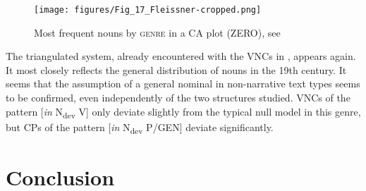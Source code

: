 \documentclass[output=paper,colorlinks,citecolor=brown]{langscibook}
\begin{document}
 
\begin{figure}[t]
    \centering
    \texttt{[image: figures/Fig\_17\_Fleissner-cropped.png]}
    \caption{Most frequent nouns by \textsc{genre} \textup{in a CA plot (}\textsc{ZERO}), see }
    \label{fig:fleissner:15}
\end{figure}

The triangulated system, already encountered with the VNCs in , appears again. It most closely reflects the general distribution of nouns in the 19th century. It seems that the assumption of a general nominal  in non-narrative text types seems to be confirmed, even independently of the two structures studied. VNCs of the pattern [\textit{in} N\textsubscript{dev} V] only deviate slightly from the typical null model in this genre, but CPs of the pattern [\textit{in} N\textsubscript{dev} P/GEN] deviate significantly.


\section{Conclusion}\label{sec:fleissner:6}
\end{document}
